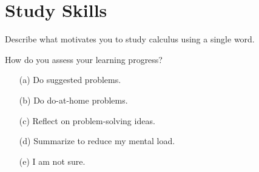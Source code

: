 \documentclass[14pt]{beamer}
\begin{document}
\section{Study Skills}
\begin{frame}
  Describe what motivates you to study calculus using a single word.
\end{frame}

\begin{frame}
  How do you assess your learning progress?

  \medskip
  \begin{itemize} \setlength\itemsep{2ex}
    \item[(a)] Do suggested problems.
    \item[(b)] Do do-at-home problems.
    \item[(c)] Reflect on problem-solving ideas.
    \item[(d)] Summarize to reduce my mental load.
    \item[(e)] I am not sure.
  \end{itemize} 
\end{frame}



%
%
\end{document}
